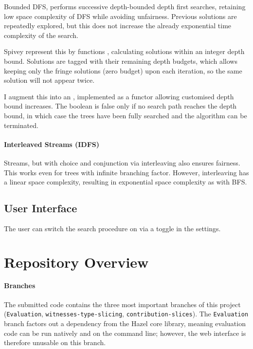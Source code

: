 Bounded DFS, performs successive depth-bounded depth first searches, retaining low space complexity of DFS while avoiding unfairness. Previous solutions are repeatedly explored, but this does not increase the already exponential time complexity of the search.

Spivey \cite{Bunches} represent this by functions , calculating solutions within an integer depth bound. Solutions are tagged with their remaining depth budgets, which allows keeping only the fringe solutions (zero budget) upon each iteration, so the same solution will not appear twice.

I augment this into an , implemented as a functor allowing customised depth bound increases. The boolean is false only if no search path reaches the depth bound, in which case the trees have been fully searched and the algorithm can be terminated.


\paragraph{Interleaved Streams (IDFS)}
Streams, but with choice and conjunction via interleaving also ensures fairness. This works even for trees with infinite branching factor. However, interleaving has a linear space complexity, resulting in exponential space complexity as with BFS.

\subsection{User Interface}
The user can switch the search procedure on via a toggle in the settings.

\section{Repository Overview}
\paragraph{Branches}
The submitted code contains the three most important branches of this project (\texttt{Evaluation}, \texttt{witnesses-type-slicing}, \texttt{contribution-slices}). The \texttt{Evaluation} branch factors out a  \cite{JSOO} dependency from the Hazel core library, meaning evaluation code can be run natively and on the command line; however, the web interface is therefore unusable on this branch.

